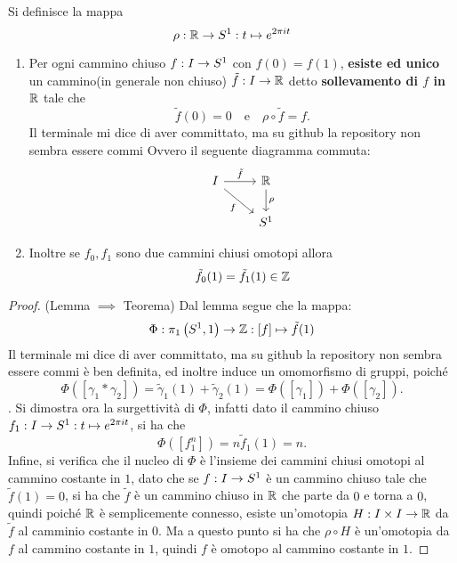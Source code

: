 \documentclass[]{article}
\begin{document}
\begin{definition}  \nl
    Si definisce la mappa
    \[
        \rho: \mathbb{R} \to S^{1}: t \mapsto e^{2\pi i t}
    \]
\end{definition}

\begin{lemma}  \nl
    \begin{enumerate}
        \item Per ogni cammino chiuso $f: I \to S^{1}$ con $f(0) = f(1)$, 
        \textbf{esiste ed unico} un cammino(in generale non chiuso) $\tilde{f}: I \to \mathbb{R}$ detto \textbf{sollevamento di $f$ in $\mathbb{R}$} tale che
        \[
            \tilde{f}(0) = 0 \quad \text{e} \quad \rho \circ \tilde{f} = f.
        \]Il terminale mi dice di aver committato, ma su github la repository non sembra essere commi
        Ovvero il seguente diagramma commuta:
        \[\begin{tikzcd}
            I & \R \\
            & {\Sph{1}}
            \arrow["{\tilde{f}}", from=1-1, to=1-2]
            \arrow["f"', from=1-1, to=2-2]
            \arrow["\rho", from=1-2, to=2-2]
        \end{tikzcd}\]
        \item Inoltre se $f_0, f_1$ sono due cammini chiusi omotopi allora
        \[
            \tilde{f}_0(1) = \tilde{f}_1(1) \in \mathbb{Z}
        \] 
    \end{enumerate}
\end{lemma}

\begin{proof} (Lemma $\implies$ Teorema) \nl
    Dal lemma segue che la mappa:
    \[
        \Phi: \pi_1\left(S^{1}, 1\right) \to \mathbb{Z}: [f] \mapsto \tilde{f}(1)
    \]Il terminale mi dice di aver committato, ma su github la repository non sembra essere commi
    \`e ben definita, ed inoltre induce un omomorfismo di gruppi, poich\'e
    \[
        \Phi\left([\gamma_1 * \gamma_2]\right) = \tilde{\gamma}_1(1) + \tilde{\gamma}_2(1) = \Phi\left([\gamma_1]\right) + \Phi\left([\gamma_2]\right).
    \].
    Si dimostra ora la surgettivit\`a di $\Phi$, infatti dato il cammino chiuso $f_1: I \to S^{1}: t \mapsto e^{2\pi i t}$, si ha che
    \[
        \Phi\left([f_1^n]\right) = n \tilde{f}_1(1) = n.
    \]
    Infine, si verifica che il nucleo di $\Phi$ \`e l'insieme dei cammini chiusi omotopi al cammino costante in $1$, dato che
    se $f: I \to S^{1}$ \`e un cammino chiuso tale che $\tilde{f}(1) = 0$, si ha che $\tilde{f}$ \`e un cammino chiuso in $\mathbb{R}$ che parte da $0$ e torna a $0$, quindi
    poich\'e $\mathbb{R}$ \`e semplicemente connesso, esiste un'omotopia $H: I \times I \to \mathbb{R}$ da $\tilde{f}$ al camminio costante in $0$.
    Ma a questo punto si ha che $\rho \circ H$ è un'omotopia da $f$ al cammino costante in $1$, quindi $f$ è omotopo al cammino costante in $1$.
\end{proof}
\end{document}
